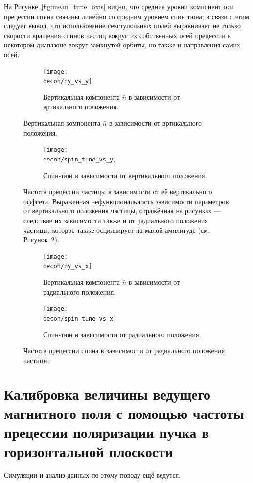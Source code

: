 \documentclass{report}
\newcommand{\Artem}{/Users/alexaksentyev/REPOS/COSYINF/img/Artem}
\newcommand{\decoh}{\Artem/decoherence_frequency_dependence}
\begin{document}
На Рисунке~\ref{fig:mean_tune_axis} видно, что средние уровни компонент оси прецессии спина связаны линейно со средним уровнем спин тюна; в связи с этим следует вывод, что использование секступольных полей выравнивает не только скорости вращения спинов частиц вокруг их собственных осей прецессии в некотором диапазоне вокруг замкнутой орбиты, но также и направления самих осей. 
\begin{figure}[H]
  \centering
  \begin{subfigure}[b]{\textwidth}
    \texttt{[image: \\decoh/ny\_vs\_y]}
    \caption{Вертикальная компонента $\bar n$ в зависимости от
      вртикального положения.}
  \end{subfigure}
\end{figure}
\begin{figure}[H]\ContinuedFloat
  \begin{subfigure}[b]{\textwidth}
    \texttt{[image: \\decoh/spin\_tune\_vs\_y]}
    \caption{Спин-тюн в зависимости от вертикального положения.}
  \end{subfigure}
  \caption{Частота прецессии частицы в зависимости от её вертикального
    оффсета. Выраженная нефункциональность зависимости
    параметров от вертикального положения частицы, отражённая на
    рисунках --- следствие их зависимости также и от радиального положения
    частицы, которое также осциллирует на малой амплитуде (см. Рисунок~\ref{fig:tune_axis_position_x}). \label{fig:tune_axis_position_y}}
\end{figure}

\begin{figure}[H]
  \centering
  \begin{subfigure}[b]{\textwidth}
    \texttt{[image: \\decoh/ny\_vs\_x]}
    \caption{Вертикальная компонента $\bar n$ в зависимости от
      радиального положения.}
  \end{subfigure}

  \begin{subfigure}[b]{\textwidth}
    \texttt{[image: \\decoh/spin\_tune\_vs\_x]}
    \caption{Спин-тюн в зависимости от радиального положения.}
  \end{subfigure}
  \caption{Частота прецессии спина в зависимости от радиального
    положения частицы.\label{fig:tune_axis_position_x}}
\end{figure}


\section{Калибровка величины ведущего магнитного поля с помощью
  частоты прецессии поляризации пучка в горизонтальной плоскости}
Симуляции и анализ данных по этому поводу ещё ведутся.
\end{document}
